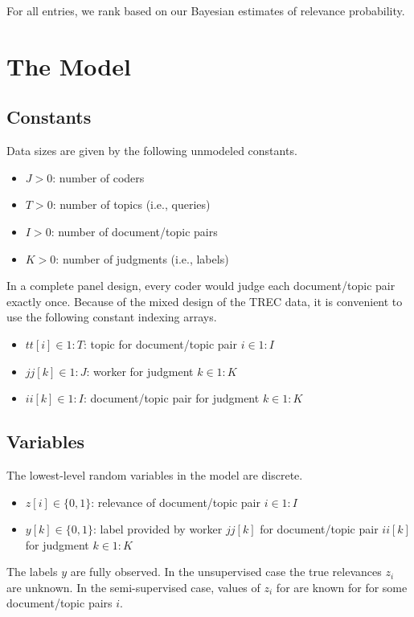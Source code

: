 \documentclass{article}
\begin{document}
For all entries, we rank based on our Bayesian estimates of
relevance probability.  


\section{The Model}

\subsection{Constants}

Data sizes are given by the following unmodeled constants.
%
\begin{itemize}
\item $J > 0$: number of coders
\item $T > 0$: number of topics (i.e., queries)
\item $I > 0$: number of document/topic pairs
\item $K > 0$: number of judgments (i.e., labels)
\end{itemize}
%
In a complete panel design, every coder would judge each
document/topic pair exactly once.  Because of the mixed design of
the TREC data, it is convenient to use the following constant indexing arrays.
%
\begin{itemize}
\item $tt[i] \in 1{:}T$: topic for document/topic pair $i \in 1{:}I$
\item $jj[k] \in 1{:}J$: worker for judgment $k \in 1{:}K$
\item $ii[k] \in 1{:}I$: document/topic pair for judgment $k \in 1{:}K$
\end{itemize}

\subsection{Variables}

The lowest-level random variables in the model are discrete.
%
\begin{itemize}
\item $z[i] \in \{0, 1\}$: relevance of document/topic pair $i \in 1{:}I$
\item $y[k] \in \{0, 1\}$: label provided by worker $jj[k]$ for
document/topic pair $ii[k]$ for judgment $k \in 1{:}K$
\end{itemize}
%
The labels $y$ are fully observed.  In the unsupervised case the true
relevances $z_i$ are unknown.  In the semi-supervised case, values of
$z_i$ for are known for for some document/topic pairs $i$.
\end{document}

